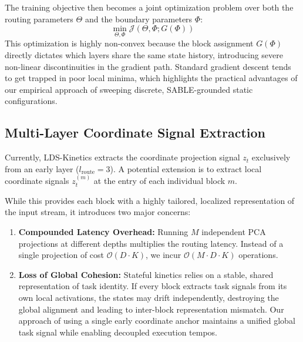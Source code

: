 \documentclass{article}
\theoremstyle{plain}
\theoremstyle{definition}
\theoremstyle{remark}
\begin{document}
The training objective then becomes a joint optimization problem over both the routing parameters $\Theta$ and the boundary parameters $\Phi$:
\begin{equation}
    \min_{\Theta, \Phi} \mathcal{J}(\Theta, \Phi; G(\Phi))
\end{equation}
This optimization is highly non-convex because the block assignment $G(\Phi)$ directly dictates which layers share the same state history, introducing severe non-linear discontinuities in the gradient path. Standard gradient descent tends to get trapped in poor local minima, which highlights the practical advantages of our empirical approach of sweeping discrete, SABLE-grounded static configurations.

\subsection{Multi-Layer Coordinate Signal Extraction}
Currently, LDS-Kinetics extracts the coordinate projection signal $z_t$ exclusively from an early layer ($l_{\text{route}} = 3$). A potential extension is to extract local coordinate signals $z^{(m)}_t$ at the entry of each individual block $m$.

While this provides each block with a highly tailored, localized representation of the input stream, it introduces two major concerns:
\begin{enumerate}
    \item \textbf{Compounded Latency Overhead:} Running $M$ independent PCA projections at different depths multiplies the routing latency. Instead of a single projection of cost $\mathcal{O}(D \cdot K)$, we incur $\mathcal{O}(M \cdot D \cdot K)$ operations.
    \item \textbf{Loss of Global Cohesion:} Stateful kinetics relies on a stable, shared representation of task identity. If every block extracts task signals from its own local activations, the states may drift independently, destroying the global alignment and leading to inter-block representation mismatch. Our approach of using a single early coordinate anchor maintains a unified global task signal while enabling decoupled execution tempos.
\end{enumerate}
\end{document}
